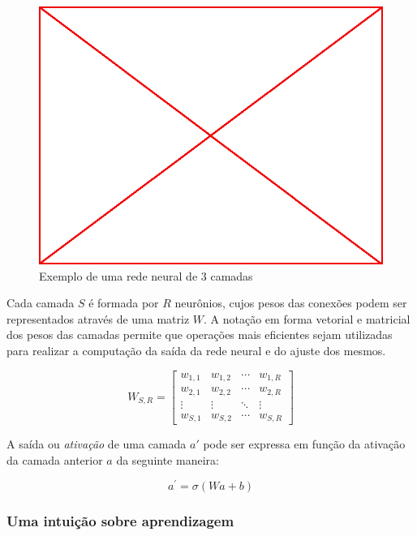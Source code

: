 \begin{figure}\label{fig:003-nn}
  \caption{Exemplo de uma rede neural de 3 camadas}
  \begin{center}
    \includegraphics[scale=0.5]{placeholder}
  \end{center}
\end{figure}

Cada camada $S$ é formada por $R$ neurônios, cujos pesos das conexões podem ser
representados através de uma matriz $W$. A notação em forma vetorial e
matricial dos pesos das camadas permite que operações mais eficientes sejam
utilizadas para realizar a computação da saída da rede neural e do ajuste dos
mesmos.

$$ W_{S,R} =
\begin{bmatrix}
  w_{1,1} & w_{1,2} & \cdots & w_{1,R} \\
  w_{2,1} & w_{2,2} & \cdots & w_{2,R} \\
  \vdots  & \vdots  & \ddots & \vdots  \\
  w_{S,1} & w_{S,2} & \cdots & w_{S,R}
\end{bmatrix}
$$

A saída ou \emph{ativação} de uma camada $a'$ pode ser expressa em função da
ativação da camada anterior $a$ da seguinte maneira:

$$a^{'} = \sigma(Wa+b)$$

\subsubsection{Uma intuição sobre aprendizagem}

